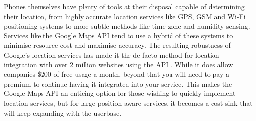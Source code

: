 Phones themselves have plenty of tools at their disposal capable of determining their location, from highly accurate location services like GPS, GSM and Wi-Fi positioning systems to more subtle methods like time-zone and humidity sensing. Services like the Google Maps API tend to use a hybrid of these systems to minimise resource cost and maximise accuracy. The resulting robustness of Google’s location services has made it the de facto method for location integration with over 2 million websites using the API \cite{BuiltWith}. While it does allow companies \$200 of free usage a month, beyond that you will need to pay a premium to continue having it integrated into your service. This makes the Google Maps API an enticing option for those wishing to quickly implement location services, but for large position-aware services, it becomes a cost sink that will keep expanding with the userbase.

